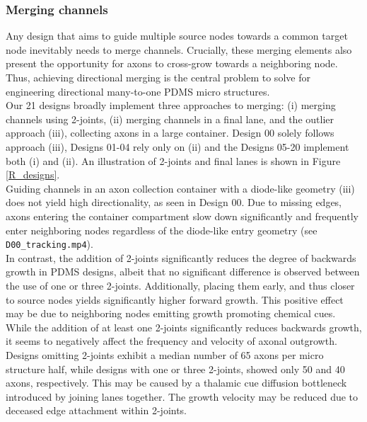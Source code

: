 \subsubsection{Merging channels}
Any design that aims to guide multiple source nodes towards a common target node
inevitably needs to merge channels. Crucially, these merging elements also
present the opportunity for axons to cross-grow towards a neighboring node.
Thus, achieving directional merging is the central problem to solve for
engineering directional many-to-one PDMS micro structures. \\
Our 21 designs broadly implement three approaches to merging: (i) merging
channels using 2-joints, (ii) merging channels in a final lane, and the outlier
approach (iii), collecting axons in a large container. Design 00 solely follows
approach (iii), Designs 01-04 rely only on (ii) and the Designs 05-20 implement
both (i) and (ii). An illustration of 2-joints and final lanes is shown in
Figure \ref{R_designs}. \\
Guiding channels in an axon collection container with a diode-like geometry
(iii) does not yield high directionality, as seen in Design 00. Due to missing
edges, axons entering the container compartment slow down significantly and
frequently enter neighboring nodes regardless of the diode-like entry geometry
(see \verb|D00_tracking.mp4|). \\
In contrast, the addition of 2-joints significantly reduces the degree of
backwards growth in PDMS designs, albeit that no significant difference is
observed between the use of one or three 2-joints. Additionally, placing them
early, and thus closer to source nodes yields significantly higher forward
growth. This positive effect may be due to neighboring nodes emitting growth
promoting chemical cues. While the addition of at least one 2-joints
significantly reduces backwards growth, it seems to negatively affect the
frequency and velocity of axonal outgrowth. Designs omitting 2-joints exhibit a
median number of 65 axons per micro structure half, while designs with one or
three 2-joints, showed only 50 and 40 axons, respectively. This may be caused by
a thalamic cue diffusion bottleneck introduced by joining lanes together. The
growth velocity may be reduced due to deceased edge attachment within
2-joints.\\

